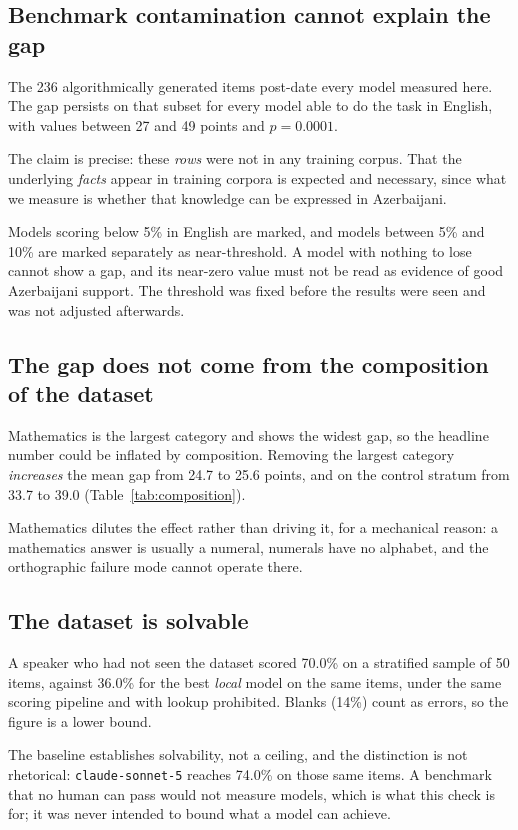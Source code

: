 \documentclass[final]{clv2025}
\begin{document}
\subsection{Benchmark contamination cannot explain the gap}

The 236 algorithmically generated items post-date every model measured here.
The gap persists on that subset for every model able to do the task in English,
with values between 27 and 49 points and $p = 0.0001$.

The claim is precise: these \emph{rows} were not in any training corpus. That
the underlying \emph{facts} appear in training corpora is expected and
necessary, since what we measure is whether that knowledge can be expressed in
Azerbaijani.

Models scoring below 5\% in English are marked, and models between 5\% and
10\% are marked separately as near-threshold. A model with nothing to lose
cannot show a gap, and its near-zero value must not be read as evidence of good
Azerbaijani support. The threshold was fixed before the results were seen and
was not adjusted afterwards.

\subsection{The gap does not come from the composition of the dataset}

Mathematics is the largest category and shows the widest gap, so the headline
number could be inflated by composition. Removing the largest category
\emph{increases} the mean gap from 24.7 to 25.6 points, and on the control
stratum from 33.7 to 39.0 (Table~\ref{tab:composition}).

Mathematics dilutes the effect rather than driving it, for a mechanical reason:
a mathematics answer is usually a numeral, numerals have no alphabet, and the
orthographic failure mode cannot operate there.

\subsection{The dataset is solvable}

A speaker who had not seen the dataset scored 70.0\% on a stratified sample of
50 items, against 36.0\% for the best \emph{local} model on the same items,
under the same scoring pipeline and with lookup prohibited. Blanks (14\%) count
as errors, so the figure is a lower bound.

The baseline establishes solvability, not a ceiling, and the distinction is not
rhetorical: \texttt{claude-sonnet-5} reaches 74.0\% on those same items. A
benchmark that no human can pass would not measure models, which is what this
check is for; it was never intended to bound what a model can achieve.
\end{document}
